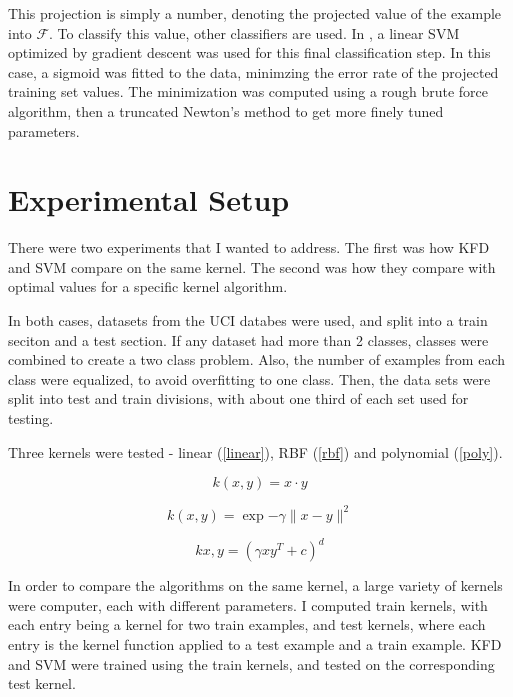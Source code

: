 \documentclass[12pt]{article}
\begin{document}
This projection is simply a number, denoting the projected value of the example into $\mathcal{F}$.  To classify this value, other classifiers are used.  In \cite{kfd}, a linear SVM optimized by gradient descent was used for this final classification step.  In this case, a sigmoid was fitted to the data, minimzing the error rate of the projected training set values.  The minimization was computed using a rough brute force algorithm, then a truncated Newton's method to get more finely tuned parameters. \cite{wright, nash}

\section{Experimental Setup}
\label{sec:expsetup}

There were two experiments that I wanted to address.  The first was how KFD and SVM compare on the same kernel.  The second was how they compare with optimal values for a specific kernel algorithm.

In both cases, datasets from the UCI databes were used, and split into a train seciton and a test section.  If any dataset had more than 2 classes, classes were combined to create a two class problem.  Also, the number of examples from each class were equalized, to avoid overfitting to one class.  Then, the data sets were split into test and train divisions, with about one third of each set used for testing.

Three kernels were tested - linear (\ref{linear}), RBF (\ref{rbf}) and polynomial (\ref{poly}).

\begin{equation}
k(x,y) = x \cdot y
\label{linear}
\end{equation}

\begin{equation}
k(x,y) = \exp{-\gamma  \parallel x - y \parallel^2}
\label{rbf}
\end{equation}

\begin{equation}
k{x,y} = (\gamma x y^T + c)^d
\label{poly}
\end{equation}

In order to compare the algorithms on the same kernel, a large variety of kernels were computer, each with different parameters.  I computed train kernels, with each entry being a kernel for two train examples, and test kernels, where each entry is the kernel function applied to a test example and a train example.  KFD and SVM were trained using the train kernels, and tested on the corresponding test kernel.
\end{document}
